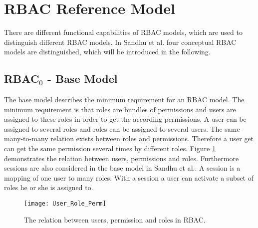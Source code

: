     \section{RBAC Reference Model}
    \label{sec:rbacmodels}
    There are different functional capabilities of RBAC models, which are used to distinguish different RBAC models. In Sandhu et al.\cite{Sandhu:1996} four conceptual RBAC models are distinguished, which will be introduced in the following.
        \subsection{RBAC$_0$ - Base Model}
            The base model describes the minimum requirement for an RBAC model. The minimum requirement is that roles are bundles of permissions and users are assigned to these roles in order to get the according permissions. A user can be assigned to several roles and roles can be assigned to several users. The same many-to-many relation exists between roles and permissions. Therefore a user get can get the same permission several times by different roles. Figure \ref{fig:basicRBAC} demonstrates the relation between users, permissions and roles. Furthermore sessions are also considered in the base model in Sandhu et al.\cite{Sandhu:1996}. A session is a mapping of one user to many roles. With a session a user can activate a subset of roles he or she is assigned to.
            \begin{figure}[H]
                \centering
                \texttt{[image: User\_Role\_Perm]}
                \caption{The relation between users, permission and roles in RBAC.}
                \label{fig:basicRBAC}
            \end{figure}
            
